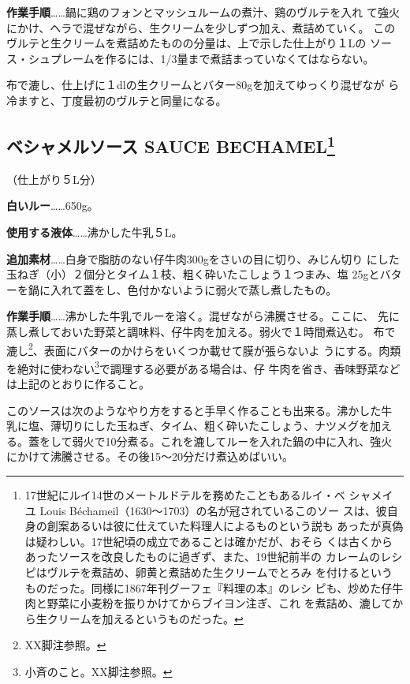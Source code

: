 \documentclass[twoside,12Q,b5paper]{escoffierltjsbook}
\begin{document}
\textbf{作業手順}\ldots{}\ldots{}鍋に鶏のフォンとマッシュルームの煮汁、鶏のヴルテを入れ
て強火にかけ、ヘラで混ぜながら、生クリームを少しずつ加え、煮詰めていく。
このヴルテと生クリームを煮詰めたものの分量は、上で示した仕上がり１Lの
ソース・シュプレームを作るには、1/3量まで煮詰まっていなくてはならない。

布で漉し、仕上げに１dlの生クリームとバター80gを加えてゆっくり混ぜなが
ら冷ますと、丁度最初のヴルテと同量になる。

\subsection[ベシャメルソース SAUCE
BECHAMEL]{\texorpdfstring{ベシャメルソース SAUCE BECHAMEL\footnote{17世紀にルイ14世のメートルドテルを務めたこともあるルイ・ベ
  シャメイユ Louis Béchameil（1630〜1703）の名が冠されているこのソー
  スは、彼自身の創案あるいは彼に仕えていた料理人によるものという説も
  あったが真偽は疑わしい。17世紀頃の成立であることは確かだが、おそら
  くは古くからあったソースを改良したものに過ぎず、また、19世紀前半の
  カレームのレシピはヴルテを煮詰め、卵黄と煮詰めた生クリームでとろみ
  を付けるというものだった。同様に1867年刊グーフェ『料理の本』のレシ
  ピも、炒めた仔牛肉と野菜に小麦粉を振りかけてからブイヨン注ぎ、これ
  を煮詰め、漉してから生クリームを加えるというものだった。}}{ベシャメルソース SAUCE BECHAMEL}}\label{ux30d9ux30b7ux30e3ux30e1ux30ebux30bdux30fcux30b9-sauce-bechamel102020}

（仕上がり５L分）

\textbf{白いルー}\ldots{}\ldots{}650g。

\textbf{使用する液体}\ldots{}\ldots{}沸かした牛乳５L。

\textbf{追加素材}\ldots{}\ldots{}白身で脂肪のない仔牛肉300gをさいの目に切り、みじん切り
にした玉ねぎ（小）２個分とタイム１枝、粗く砕いたこしょう１つまみ、塩
25gとバターを鍋に入れて蓋をし、色付かないように弱火で蒸し煮したもの。

\textbf{作業手順}\ldots{}\ldots{}沸かした牛乳でルーを溶く。混ぜながら沸騰させる。ここに、
先に蒸し煮しておいた野菜と調味料、仔牛肉を加える。弱火で１時間煮込む。
布で漉し\footnote{XX脚注参照。}、表面にバターのかけらをいくつか載せて膜が張らないよ
うにする。肉類を絶対に使わない\footnote{小斉のこと。XX脚注参照。}で調理する必要がある場合は、仔
牛肉を省き、香味野菜などは上記のとおりに作ること。

このソースは次のようなやり方をすると手早く作ることも出来る。沸かした牛
乳に塩、薄切りにした玉ねぎ、タイム、粗く砕いたこしょう、ナツメグを加え
る。蓋をして弱火で10分煮る。これを漉してルーを入れた鍋の中に入れ、強火
にかけて沸騰させる。その後15〜20分だけ煮込めばいい。
\end{document}
